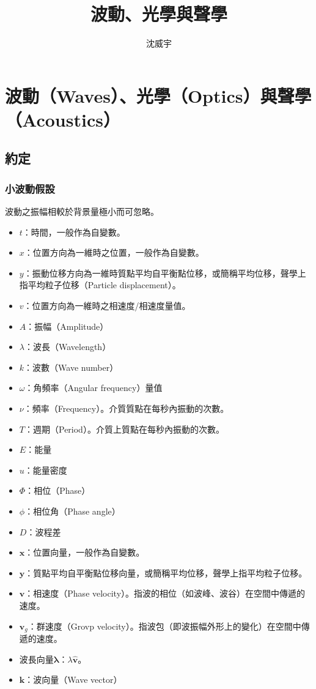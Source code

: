 \documentclass[a4paper,12pt]{report}
\begin{document}
\title{波動、光學與聲學}
\author{沈威宇}
\date{\temtoday}
\titletocdoc
\chapter{波動（Waves）、光學（Optics）與聲學（Acoustics）}
\section{約定}
\subsection{小波動假設}
波動之振幅相較於背景量極小而可忽略。
\begin{itemize}
\item $t$：時間，一般作為自變數。
\item $x$：位置方向為一維時之位置，一般作為自變數。
\item $y$：振動位移方向為一維時質點平均自平衡點位移，或簡稱平均位移，聲學上指平均粒子位移（Particle displacement）。
\item $v$：位置方向為一維時之相速度/相速度量值。
\item $A$：振幅（Amplitude）
\item $\lambda$：波長（Wavelength）
\item $k$：波數（Wave number）
\item $\omega$：角頻率（Angular frequency）量值
\item $\nu$：頻率（Frequency）。介質質點在每秒內振動的次數。
\item $T$：週期（Period）。介質上質點在每秒內振動的次數。
\item $E$：能量
\item $u$：能量密度
\item $\Phi$：相位（Phase）
\item $\phi$：相位角（Phase angle）
\item $D$：波程差
\end{itemize}
\begin{itemize}
\item $\mathbf{x}$：位置向量，一般作為自變數。
\item $\mathbf{y}$：質點平均自平衡點位移向量，或簡稱平均位移，聲學上指平均粒子位移。
\item $\mathbf{v}$：相速度（Phase velocity）。指波的相位（如波峰、波谷）在空間中傳遞的速度。
\item $\mathbf{v}_g$：群速度（Grovp velocity）。指波包（即波振幅外形上的變化）在空間中傳遞的速度。
\item 波長向量$\mathbf{\lambda}$：$\lambda\hat{\mathbf{v}}$。
\item $\mathbf{k}$：波向量（Wave vector）
\end{itemize}
\end{document}
